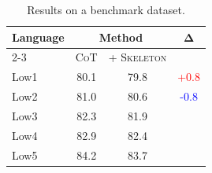 \begin{table}[t]
\centering
\small
\setlength{\tabcolsep}{6pt} %
\begin{tabular}{lccc}
\toprule
\multirow{2}{*}{\textbf{Language}} & \multicolumn{2}{c}{\textbf{Method}} & \multirow{2}{*}{$\boldsymbol{\Delta}$} \\
\cmidrule(lr){2-3}
 & \textsc{CoT} & + \textsc{Skeleton} \\
\midrule
Low1        & 80.1 & 79.8 & \textcolor{red}{+0.8} \\
Low2        & 81.0 & 80.6 & \textcolor{blue}{-0.8} \\
Low3        & 82.3 & 81.9 & \\
Low4        & 82.9 & 82.4 & \\
Low5        & 84.2 & 83.7 & \\

\bottomrule
\end{tabular}
\caption{Results on a benchmark dataset.}
\label{tab:acl_onecol_example}
\end{table}
